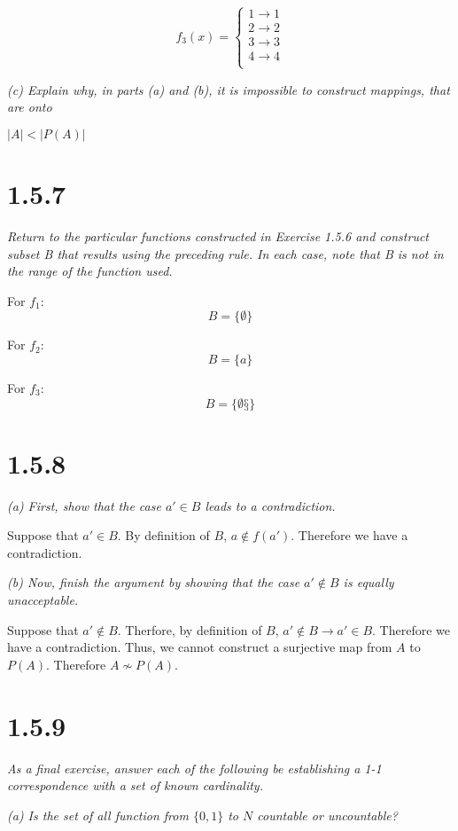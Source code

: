 \documentclass[11pt,oneside,titlepage]{book}
\begin{document}
\begin{equation}
  f_3(x) =
  \begin{cases}
    1 \to {1} \\
    2 \to {2} \\
    3 \to {3} \\
    4 \to {4} \\
  \end{cases}    
\end{equation}

\textit{(c) Explain why, in parts (a) and (b), it is impossible to construct mappings,
  that are onto}

$|A| < |P(A)|$

\section*{1.5.7}
\textit{Return to the particular functions constructed in Exercise 1.5.6 and construct
  subset B that results using the preceding rule. In each case, note that B is not in
  the range of the function used. }

For $f_1$:
$$B = \{\emptyset\}$$

For $f_2$:
$$B = \{a\}$$

For $f_3$:
$$B = \{\emptyset§\}$$

\section*{1.5.8}
\textit{(a) First, show that the case $a' \in B$ leads to a contradiction.}

Suppose that $a' \in B$. By definition of $B$,  $a \notin f(a')$. Therefore we have a
contradiction.

\textit{(b) Now, finish the argument by showing that the case $a' \notin B$ is
  equally unacceptable.}

Suppose that $a' \notin B$. Therfore, by definition of $B$, $a' \notin B \to a' \in B$.
Therefore we have a contradiction. Thus, we cannot construct a surjective map from $A$ to
$P(A)$. Therefore $A \not\sim P(A)$.

\section*{1.5.9}
\textit{As a final exercise, answer each of the following be establishing a 1-1
  correspondence with a set of known cardinality.}

\textit{(a) Is the set of all function from $\{0, 1\}$ to $N$ countable or
  uncountable?}
\end{document}
